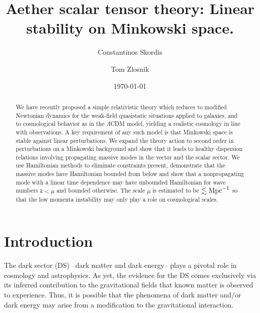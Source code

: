 \documentclass[twocolumn,prd,preprintnumbers,amsmath,amssymb,nofootinbib,superscriptaddress]{revtex4-1}
\newcommand{\Mpc}{\ensuremath{{\rm Mpc}}}
\begin{document}
\title{Aether scalar tensor theory: Linear stability on Minkowski space.}

\author{Constantinos Skordis}
\author{Tom Zlosnik}
\date{\today}

\begin{abstract}  
We have recently proposed a simple relativistic theory which reduces to modified Newtonian dynamics for the weak-field quasistatic situations applied to galaxies, 
and to cosmological behavior as in the $\Lambda$CDM model, yielding a realistic cosmology in line with observations. 
A key requirement of any such model is that Minkowski space is stable against linear perturbations.
We expand the theory action to second
 order in perturbations on a Minkowski background and show that it leads to healthy dispersion relations involving propagating massive  modes
in the vector and the scalar sector. 
We use Hamiltonian methods to eliminate constraints present, demonstrate that the massive modes have Hamiltonian bounded from below
and show that a nonpropagating mode with a linear time dependence may have unbounded Hamiltonian for wave numbers $k< \mu$ and bounded otherwise. 
The scale $\mu$ is estimated to be $\lesssim \Mpc^{-1}$ so that the low momenta instability may only play a role on cosmological scales.
\end{abstract}

\maketitle



\section{Introduction}
%
The dark sector (DS) --dark matter and dark energy-- plays a pivotal role in cosmology and astrophysics. 
As yet, the evidence for the DS comes exclusively via its inferred contribution to the gravitational fields that known matter is observed to experience. Thus, it is possible that the phenomena of dark matter and/or dark energy may arise from a modification to the gravitational interaction.
\end{document}
